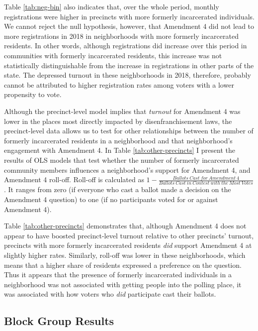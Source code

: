 \documentclass[
  12pt,
]{article}
\begin{document}
Table \ref{tab:neg-bin} also indicates that, over the whole period, monthly registrations were higher in precincts with more formerly incarcerated individuals. We cannot reject the null hypothesis, however, that Amendment 4 did not lead to more registrations in 2018 in neighborhoods with more formerly incarcerated residents. In other words, although registrations did increase over this period in communities with formerly incarcerated residents, this increase was not statistically distinguishable from the increase in registrations in other parts of the state. The depressed turnout in these neighborhoods in 2018, therefore, probably cannot be attributed to higher registration rates among voters with a lower propensity to vote.

Although the precinct-level model implies that \emph{turnout} for Amendment 4 was lower in the places most directly impacted by disenfranchisement laws, the precinct-level data allows us to test for other relationships between the number of formerly incarcerated residents in a neighborhood and that neighborhood's engagement with Amendment 4. In Table \ref{tab:other-precincts} I present the results of OLS models that test whether the number of formerly incarcerated community members influences a neighborhood's support for Amendment 4, and Amendment 4 roll-off. Roll-off is calculated as \(1 - \frac{Ballots\:Cast\:for\:Amendment\:4}{Ballots\:Cast\:in\:Contest\:with\:the\:Most\:Votes}\). It ranges from zero (if everyone who cast a ballot made a decision on the Amendment 4 question) to one (if no participants voted for or against Amendment 4).

\begin{singlespace}


\end{singlespace}

Table \ref{tab:other-precincts} demonstrates that, although Amendment 4 does not appear to have boosted precinct-level turnout relative to other precincts' turnout, precincts with more formerly incarcerated residents \emph{did} support Amendment 4 at slightly higher rates. Similarly, roll-off was lower in these neighborhoods, which means that a higher share of residents expressed a preference on the question. Thus it appears that the presence of formerly incarcerated individuals in a neighborhood was not associated with getting people into the polling place, it was associated with how voters who \emph{did} participate cast their ballots.

\hypertarget{block-group-results}{%
\subsection*{Block Group Results}\label{block-group-results}}
\end{document}
